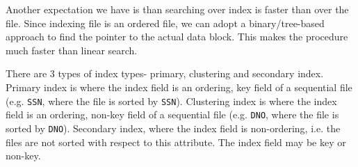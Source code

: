 \documentclass[a4paper, openany]{memoir}
\begin{document}
Another expectation we have is than searching over index is faster than over the file. Since indexing file is an ordered file, we can adopt a binary/tree-based approach to find the pointer to the actual data block. This makes the procedure much faster than linear search.

There are 3 types of index types- primary, clustering and secondary index. Primary index is where the index field is an ordering, key field of a sequential file (e.g. \texttt{SSN}, where the file is sorted by \texttt{SSN}). Clustering index is where the index field is an ordering, non-key field of a sequential file (e.g. \texttt{DNO}, where the file is sorted by \texttt{DNO}). Secondary index, where the index field is non-ordering, i.e. the files are not sorted with respect to this attribute. The index field may be key or non-key.
\end{document}
